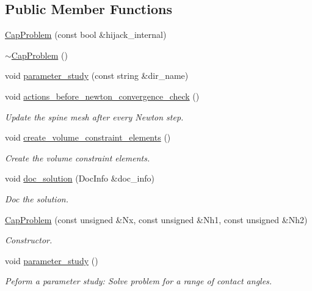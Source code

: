 \subsection*{Public Member Functions}
\begin{DoxyCompactItemize}
\item 
\hyperlink{classCapProblem_ab03ed8e2c1b44911d11209e00cb28a42}{Cap\+Problem} (const bool \&hijack\+\_\+internal)
\item 
\hyperlink{classCapProblem_ad2b434212ecb33467359aef1071bc964}{$\sim$\+Cap\+Problem} ()
\item 
void \hyperlink{classCapProblem_af54251f12b42b85c6caf88e5214f45da}{parameter\+\_\+study} (const string \&dir\+\_\+name)
\item 
void \hyperlink{classCapProblem_ac852570b51489f4bf744b6063fbfa01a}{actions\+\_\+before\+\_\+newton\+\_\+convergence\+\_\+check} ()
\begin{DoxyCompactList}\small\item\em Update the spine mesh after every Newton step. \end{DoxyCompactList}\item 
void \hyperlink{classCapProblem_aa3a891fe6f5fc5fb5829e3bf636eda2c}{create\+\_\+volume\+\_\+constraint\+\_\+elements} ()
\begin{DoxyCompactList}\small\item\em Create the volume constraint elements. \end{DoxyCompactList}\item 
void \hyperlink{classCapProblem_a8549ca722d2d151ebf3ef7b35b925fbb}{doc\+\_\+solution} (Doc\+Info \&doc\+\_\+info)
\begin{DoxyCompactList}\small\item\em Doc the solution. \end{DoxyCompactList}\item 
\hyperlink{classCapProblem_a7b3e0784884fa8bf9d151139b00951c7}{Cap\+Problem} (const unsigned \&Nx, const unsigned \&Nh1, const unsigned \&Nh2)
\begin{DoxyCompactList}\small\item\em Constructor. \end{DoxyCompactList}\item 
void \hyperlink{classCapProblem_a680e8e486a229479dad687e10a5fa03a}{parameter\+\_\+study} ()
\begin{DoxyCompactList}\small\item\em Peform a parameter study\+: Solve problem for a range of contact angles. \end{DoxyCompactList}\item 

\end{DoxyCompactItemize}

